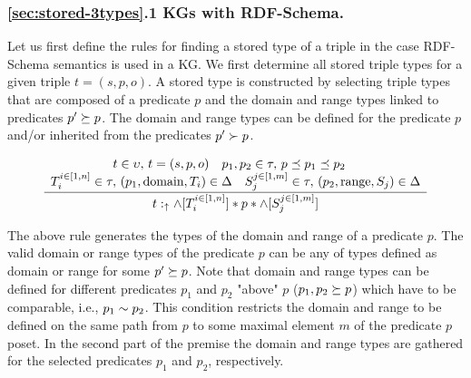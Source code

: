 \documentclass[runningheads]{llncs}
\newcommand{\uarr}{\uparrow}
\newcommand{\memo}[1]{}
\begin{document}
\memo{
How to define types of predicates when we have $\land$ and $\lor$-types possibly in different ontologies, RDF graphs, or KGs.
Different situations where and how the domains and ranges of predicate can be defined.
List some possibilities: diff ontologies, diff contexts, explicit definition of union in a context,...
We are goiung to use OWL syntax for the definition of domains and ranges.
For simplicity we assume that for each predicate we have a definition of the domain (range) in disjunctive noraml form.
}

\subsubsection{\ref{sec:stored-3types}.1 KGs with RDF-Schema.}
Let us first define the rules for finding a stored type of a triple in
the case RDF-Schema semantics is used in a KG. We first determine all
stored triple types for a given triple $t=(s,p,o)$. A stored type is
constructed by selecting triple types that are composed of a predicate
$p$ and the domain and range types linked to predicates
$p'\succeq\/p$. The domain and range types can be defined for the
predicate $p$ and/or inherited from the predicates $p'\succ\/p$.

\begin{equation}
\label{rul:3-stored1}
\dfrac{\begin{array}{c}
       t\in\upsilon,\, t=(s,p,o)\quad p_1,p_2\in\tau,\, p\preceq\/p_1\preceq\/p_2\quad \\
       T_i^{i\in[1,n]}\in\tau,\, (p_1,\text{domain},T_i)\in\/\Delta\quad S_j^{j\in[1,m]}\in\tau,\, (p_2,\text{range},S_j)\in\Delta
       \end{array}}
      {t:_\uarr\/\land[T_i^{i\in[1,n]}]*p*\land[S_j^{j\in[1,m]}]}
\end{equation}

The above rule generates the types of the domain and range of a
predicate $p$. The valid domain or range types of the predicate $p$
can be any of types defined as domain or range for some
$p'\succeq\/p$. Note that domain and range types can be defined for
different predicates $p_1$ and $p_2$ "above" $p$ ($p_1,p_2\succeq\/p$)
which have to be comparable, i.e., $p_1\sim\/p_2$. This condition
restricts the domain and range to be defined on the same path from $p$
to some maximal element $m$ of the predicate $p$ poset. In the second
part of the premise the domain and range types are gathered for the
selected predicates $p_1$ and $p_2$, respectively.
\end{document}
